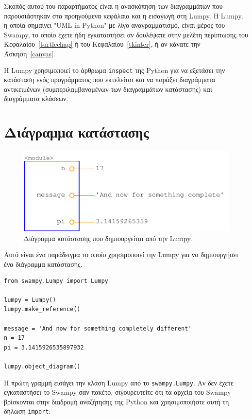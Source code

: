 \documentclass[10pt]{book}
\begin{document}
Σκοπός αυτού του παραρτήματος είναι η ανασκόπηση των διαγραμμάτων που παρουσιάστηκαν στα προηγούμενα κεφάλαια και η εισαγωγή στη  Lumpy.   Η  
Lumpy,  η οποία σημαίνει  "UML in Python"  με λίγο αναγραμματισμό, είναι 
μέρος του  Swampy,  το οποίο έχετε ήδη εγκαταστήσει αν δουλέψατε στην μελέτη περίπτωσης του Κεφαλαίου~\ref{turtlechap} ή του Κεφαλαίου~\ref{tkinter}, ή αν κάνατε την Άσκηση~\ref{canvas}.

Η  Lumpy  χρησιμοποιεί το άρθρωμα  {\tt inspect}  της  Python  για να εξετάσει την κατάσταση ενός προγράμματος που εκτελείται και να παράξει διαγράμματα αντικειμένων (συμπεριλαμβανομένων των διαγραμμάτων κατάστασης) και 
διαγράμματα κλάσεων.


\section{Διάγραμμα κατάστασης}

\begin{figure}
\centerline
{\includegraphics[scale=0.7]{figs/lumpydemo1.pdf}}
\caption{Διάγραμμα κατάστασης που δημιουργείται από την  Lumpy.} 
\label{fig.lumpy1}
\end{figure}

Αυτό είναι ένα παράδειγμα το οποίο χρησιμοποιεί την  Lumpy  για να δημιουργήσει ένα διάγραμμα κατάστασης.
  

\begin{verbatim}
from swampy.Lumpy import Lumpy

lumpy = Lumpy()
lumpy.make_reference()

message = 'And now for something completely different'
n = 17
pi = 3.1415926535897932

lumpy.object_diagram()
\end{verbatim}

Η πρώτη γραμμή εισάγει την κλάση  Lumpy  από το  {\tt swampy.Lumpy}.  
Αν δεν έχετε εγκαταστήσει το  Swampy  σαν πακέτο, σιγουρευτείτε ότι τα αρχεία του  Swampy  βρίσκονται στην διαδρομή αναζήτησης της  Python  και χρησιμοποιήστε αυτή τη δήλωση  {\tt import}:
\end{document}
